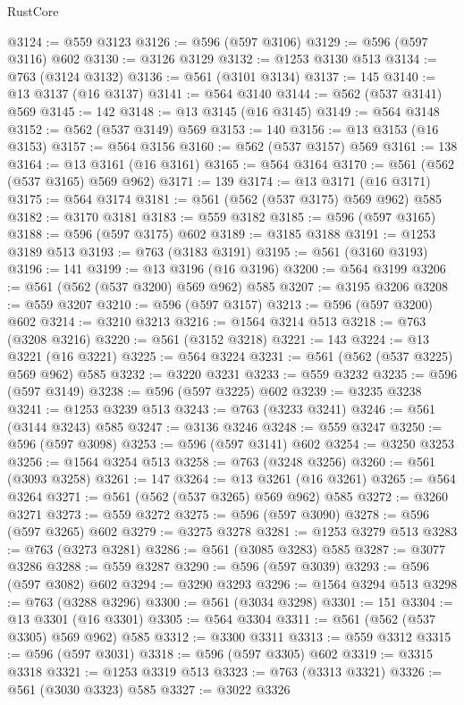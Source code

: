 \begin{lexlean}{RustCore}
\begin{coremodule}
@3124 := @559 @3123
@3126 := @596 (@597 @3106)
@3129 := @596 (@597 @3116) @602
@3130 := @3126 @3129
@3132 := @1253 @3130 @513
@3134 := @763 (@3124 @3132)
@3136 := @561 (@3101 @3134)
@3137 := 145
@3140 := @13 @3137 (@16 @3137)
@3141 := @564 @3140
@3144 := @562 (@537 @3141) @569
@3145 := 142
@3148 := @13 @3145 (@16 @3145)
@3149 := @564 @3148
@3152 := @562 (@537 @3149) @569
@3153 := 140
@3156 := @13 @3153 (@16 @3153)
@3157 := @564 @3156
@3160 := @562 (@537 @3157) @569
@3161 := 138
@3164 := @13 @3161 (@16 @3161)
@3165 := @564 @3164
@3170 := @561 (@562 (@537 @3165) @569 @962)
@3171 := 139
@3174 := @13 @3171 (@16 @3171)
@3175 := @564 @3174
@3181 := @561 (@562 (@537 @3175) @569 @962) @585
@3182 := @3170 @3181
@3183 := @559 @3182
@3185 := @596 (@597 @3165)
@3188 := @596 (@597 @3175) @602
@3189 := @3185 @3188
@3191 := @1253 @3189 @513
@3193 := @763 (@3183 @3191)
@3195 := @561 (@3160 @3193)
@3196 := 141
@3199 := @13 @3196 (@16 @3196)
@3200 := @564 @3199
@3206 := @561 (@562 (@537 @3200) @569 @962) @585
@3207 := @3195 @3206
@3208 := @559 @3207
@3210 := @596 (@597 @3157)
@3213 := @596 (@597 @3200) @602
@3214 := @3210 @3213
@3216 := @1564 @3214 @513
@3218 := @763 (@3208 @3216)
@3220 := @561 (@3152 @3218)
@3221 := 143
@3224 := @13 @3221 (@16 @3221)
@3225 := @564 @3224
@3231 := @561 (@562 (@537 @3225) @569 @962) @585
@3232 := @3220 @3231
@3233 := @559 @3232
@3235 := @596 (@597 @3149)
@3238 := @596 (@597 @3225) @602
@3239 := @3235 @3238
@3241 := @1253 @3239 @513
@3243 := @763 (@3233 @3241)
@3246 := @561 (@3144 @3243) @585
@3247 := @3136 @3246
@3248 := @559 @3247
@3250 := @596 (@597 @3098)
@3253 := @596 (@597 @3141) @602
@3254 := @3250 @3253
@3256 := @1564 @3254 @513
@3258 := @763 (@3248 @3256)
@3260 := @561 (@3093 @3258)
@3261 := 147
@3264 := @13 @3261 (@16 @3261)
@3265 := @564 @3264
@3271 := @561 (@562 (@537 @3265) @569 @962) @585
@3272 := @3260 @3271
@3273 := @559 @3272
@3275 := @596 (@597 @3090)
@3278 := @596 (@597 @3265) @602
@3279 := @3275 @3278
@3281 := @1253 @3279 @513
@3283 := @763 (@3273 @3281)
@3286 := @561 (@3085 @3283) @585
@3287 := @3077 @3286
@3288 := @559 @3287
@3290 := @596 (@597 @3039)
@3293 := @596 (@597 @3082) @602
@3294 := @3290 @3293
@3296 := @1564 @3294 @513
@3298 := @763 (@3288 @3296)
@3300 := @561 (@3034 @3298)
@3301 := 151
@3304 := @13 @3301 (@16 @3301)
@3305 := @564 @3304
@3311 := @561 (@562 (@537 @3305) @569 @962) @585
@3312 := @3300 @3311
@3313 := @559 @3312
@3315 := @596 (@597 @3031)
@3318 := @596 (@597 @3305) @602
@3319 := @3315 @3318
@3321 := @1253 @3319 @513
@3323 := @763 (@3313 @3321)
@3326 := @561 (@3030 @3323) @585
@3327 := @3022 @3326

\end{coremodule}
\end{lexlean}
